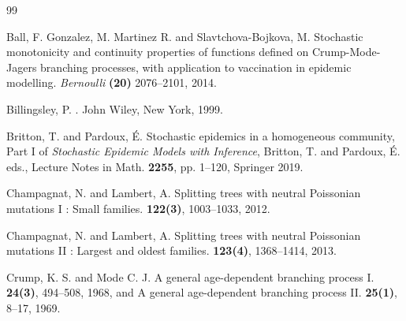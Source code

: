 \documentclass[11pt]{article}
\begin{document}
\begin{thebibliography}{99}

Ball, F.  Gonzalez, M. Martinez R.  and Slavtchova-Bojkova, M.  Stochastic monotonicity and continuity properties of functions
defined on Crump-Mode-Jagers branching processes, with application to vaccination in epidemic modelling.  {\it Bernoulli}  {\bf(20)} 
2076--2101, 2014.


Billingsley, P. 
.
\newblock John Wiley, New York, 1999.

 Britton, T. and Pardoux, \'E.
\newblock Stochastic epidemics in a homogeneous community, 
\newblock Part I of {\em Stochastic Epidemic Models with Inference}, Britton, T. and Pardoux, \'E. eds.,
Lecture Notes in Math. {\bf2255}, pp. 1--120, Springer 2019.  

Champagnat, N. and Lambert, A. 
\newblock Splitting trees with neutral Poissonian mutations I : Small families. 
  {\bf122(3)}, 1003--1033, 2012.

Champagnat, N. and Lambert, A. 
\newblock Splitting trees with neutral Poissonian mutations II : Largest and oldest families. 
  {\bf123(4)}, 1368--1414, 2013.

Crump, K. S. and Mode C. J.
\newblock A general age-dependent branching process I.
  {\bf24(3)}, 494--508, 1968, and
\newblock A general age-dependent branching process II.
  {\bf25(1)}, 8--17, 1969.





\end{thebibliography}
\end{document}
